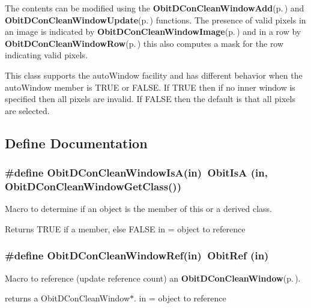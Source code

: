 The contents can be modified using the {\bf Obit\-DCon\-Clean\-Window\-Add}{\rm (p.\,\pageref{ObitDConCleanWindow_8c_a19})} and {\bf Obit\-DCon\-Clean\-Window\-Update}{\rm (p.\,\pageref{ObitDConCleanWindow_8c_a21})} functions. The presence of valid pixels in an image is indicated by {\bf Obit\-DCon\-Clean\-Window\-Image}{\rm (p.\,\pageref{ObitDConCleanWindow_8c_a23})} and in a row by {\bf Obit\-DCon\-Clean\-Window\-Row}{\rm (p.\,\pageref{ObitDConCleanWindow_8c_a24})} this also computes a mask for the row indicating valid pixels.

This class supports the auto\-Window facility and has different behavior when the auto\-Window member is TRUE or FALSE. If TRUE then if no inner window is specified then all pixels are invalid. If FALSE then the default is that all pixels are selected.

\subsection{Define Documentation}
\subsubsection{\setlength{\rightskip}{0pt plus 5cm}\#define Obit\-DCon\-Clean\-Window\-Is\-A(in)\ Obit\-Is\-A (in, Obit\-DCon\-Clean\-Window\-Get\-Class())}\label{ObitDConCleanWindow_8h_a2}


Macro to determine if an object is the member of this or a derived class. 

Returns TRUE if a member, else FALSE in = object to reference 
\subsubsection{\setlength{\rightskip}{0pt plus 5cm}\#define Obit\-DCon\-Clean\-Window\-Ref(in)\ Obit\-Ref (in)}\label{ObitDConCleanWindow_8h_a1}


Macro to reference (update reference count) an {\bf Obit\-DCon\-Clean\-Window}{\rm (p.\,\pageref{structObitDConCleanWindow})}. 

returns a Obit\-DCon\-Clean\-Window$\ast$. in = object to reference 
